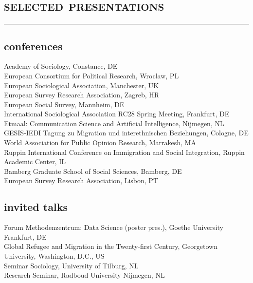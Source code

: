 \documentclass[11pt, a4paper]{article}
\newcommand{\years}[1]{\marginnote{~~#1}}
\begin{document}
\section*{\textsc{selected presentations}}
\vskip-20pt{\noindent\rule{\textwidth}{1pt}}
\subsection*{conferences}
\noindent
\years{2019}Academy of Sociology, Constance, DE\\
European Consortium for Political Research, Wroclaw, PL\\
European Sociological Association, Manchester, UK\\
European Survey Research Association, Zagreb, HR\\
European Social Survey, Mannheim, DE\\
International Sociological Association RC28 Spring Meeting, Frankfurt, DE\\
Etmaal: Communication Science and Artificial Intelligence, Nijmegen, NL\\
\years{2018}GESIS-IEDI Tagung zu Migration und interethnischen Beziehungen, Cologne, DE\\
World Association for Public Opinion Research, Marrakesh, MA\\
Ruppin International Conference on Immigration and Social Integration, Ruppin Academic Center, IL\\
\years{2017}%
Bamberg Graduate School of Social Sciences, Bamberg, DE\\
European Survey Research Association, Lisbon, PT\\
\subsection*{invited talks}
\noindent
\years{2019}%
Forum Methodenzentrum: Data Science (poster pres.), Goethe University Frankfurt, DE\\
\years{2018}Global Refugee and Migration in the Twenty-first Century, Georgetown University, Washington, D.C., US\\
Seminar Sociology, University of Tilburg, NL\\
Research Seminar, Radboud University Nijmegen, NL
\end{document}
